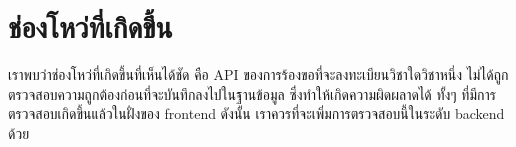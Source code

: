\section{ช่องโหว่ที่เกิดขึ้น}

เราพบว่าช่องโหว่ที่เกิดขึ้นที่เห็นได้ชัด คือ API ของการร้องขอที่จะลงทะเบียนวิชาใดวิชาหนึ่ง ไม่ได้ถูกตรวจสอบความถูกต้องก่อนที่จะบันทึกลงไปในฐานข้อมูล ซึ่งทำให้เกิดความผิดผลาดได้ ทั้งๆ ที่มีการตรวจสอบเกิดขึ้นแล้วในฝั่งของ frontend
ดังนั้น เราควรที่จะเพิ่มการตรวจสอบนี้ในระดับ backend ด้วย
